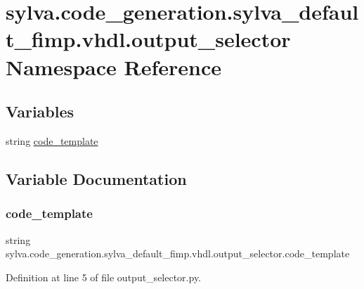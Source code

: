 \hypertarget{namespacesylva_1_1code__generation_1_1sylva__default__fimp_1_1vhdl_1_1output__selector}{}\section{sylva.\+code\+\_\+generation.\+sylva\+\_\+default\+\_\+fimp.\+vhdl.\+output\+\_\+selector Namespace Reference}
\label{namespacesylva_1_1code__generation_1_1sylva__default__fimp_1_1vhdl_1_1output__selector}
\subsection*{Variables}
\begin{DoxyCompactItemize}
\item 
string \hyperlink{namespacesylva_1_1code__generation_1_1sylva__default__fimp_1_1vhdl_1_1output__selector_a0738ed23c1af862d7e3f98c62afbbff2}{code\+\_\+template}
\end{DoxyCompactItemize}


\subsection{Variable Documentation}
\mbox{\label{namespacesylva_1_1code__generation_1_1sylva__default__fimp_1_1vhdl_1_1output__selector_a0738ed23c1af862d7e3f98c62afbbff2}} 
\subsubsection{\texorpdfstring{code\+\_\+template}{code\_template}}
{\footnotesize\ttfamily string sylva.\+code\+\_\+generation.\+sylva\+\_\+default\+\_\+fimp.\+vhdl.\+output\+\_\+selector.\+code\+\_\+template}



Definition at line 5 of file output\+\_\+selector.\+py.

